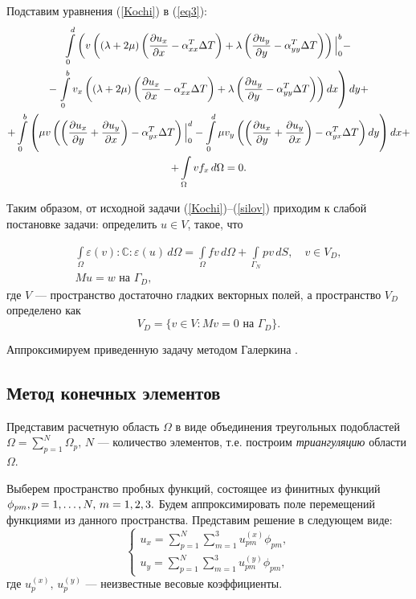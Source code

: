 \documentclass[12pt, a4paper]{article}
\begin{document}
Подставим уравнения (\ref{Kochi}) в (\ref{eq3}):
\begin{multline}
	\int\limits_0^d \left(v\left((\lambda+2\mu)\left(\frac{\partial u_x}{\partial x}-\alpha_{xx}^T\Delta T\right)+\lambda\left(\frac{\partial u_y}{\partial y}-\alpha_{yy}^T\Delta T\right)\right)\Big|_0^b-\right.\\ -\left.\int\limits_0^b v_x\left((\lambda+2\mu)\left(\frac{\partial u_x}{\partial x}-\alpha_{xx}^T\Delta T\right)+\lambda\left(\frac{\partial u_y}{\partial y}-\alpha_{yy}^T\Delta T\right)\right)dx\right)dy+\\
	+\int\limits_0^b \left(\mu v\left(\left(\frac{\partial u_x}{\partial y}+\frac{\partial u_y}{\partial x}\right)-\alpha_{yx}^T\Delta T\right)\Big|_0^d-\int\limits_0^d \mu v_y\left(\left(\frac{\partial u_x}{\partial y}+\frac{\partial u_y}{\partial x}\right)-\alpha_{yx}^T\Delta T\right)dy\right)dx+\\+\int\limits_{\Omega}v f_{x}\,d\Omega=0.
		\label{eq4}
\end{multline}

Таким образом, от исходной задачи (\ref{Kochi})--(\ref{silov}) приходим к слабой постановке задачи: определить $u\in V$, такое, что

\[\begin{gathered}
\int\limits_\Omega\varepsilon(v):\mathbb C:\varepsilon(u)\,d\Omega=\int\limits_\Omega f v\, d\Omega+\int\limits_{\Gamma_N} p v \,dS,\quad v\in V_D,\\
Mu=w \text{ на } \Gamma_D,
\end{gathered}
\]
где $V$ --- пространство достаточно гладких векторных полей, а пространство $V_D$ определено как
\[
V_D=\{v\in V:Mv=0\text{ на } \Gamma_D\}.
\]

Аппроксимируем приведенную задачу методом Галеркина \cite{galanin1}.
\newpage
\subsection{Метод конечных элементов}
Представим расчетную область $\Omega$ в виде объединения треугольных подобластей $\Omega = \sum\limits_{p=1}^N \Omega_p,\,N$ --- количество элементов, т.е. построим \textit{триангуляцию} области $\Omega$. 

Выберем пространство пробных функций, состоящее	из финитных функций $\phi_{pm},\,\\p=1,\dots,N,\,m=1,2,3.$ Будем аппроксимировать поле перемещений функциями из данного пространства. Представим решение в следующем виде:
\begin{equation}
	\begin{cases}
		u_x=\sum\limits_{p=1}^N\sum\limits_{m=1}^3 u_{pm}^{(x)}\phi_{pm},\\
		u_y=\sum\limits_{p=1}^N\sum\limits_{m=1}^3 u_{pm}^{(y)}\phi_{pm},
		\label{ishemvvide}	
	\end{cases}
\end{equation}
 где $u_p^{(x)},\,u_p^{(y)}$ --- неизвестные весовые коэффициенты.
\end{document}
